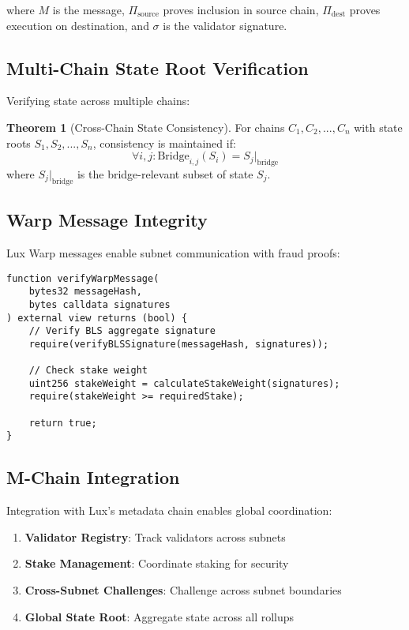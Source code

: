 \documentclass[11pt,a4paper]{article}
\theoremstyle{definition}
\newtheorem{theorem}{Theorem}[section]
\begin{document}
where $M$ is the message, $\Pi_{\text{source}}$ proves inclusion in source chain, $\Pi_{\text{dest}}$ proves execution on destination, and $\sigma$ is the validator signature.

\subsection{Multi-Chain State Root Verification}

Verifying state across multiple chains:

\begin{theorem}[Cross-Chain State Consistency]
For chains $C_1, C_2, ..., C_n$ with state roots $S_1, S_2, ..., S_n$, consistency is maintained if:
\begin{equation}
\forall i,j : \text{Bridge}_{i,j}(S_i) = S_j|_{\text{bridge}}
\end{equation}
where $S_j|_{\text{bridge}}$ is the bridge-relevant subset of state $S_j$.
\end{theorem}

\subsection{Warp Message Integrity}

Lux Warp messages enable subnet communication with fraud proofs:

\begin{lstlisting}[language=Solidity, caption=Warp Message Verification]
function verifyWarpMessage(
    bytes32 messageHash,
    bytes calldata signatures
) external view returns (bool) {
    // Verify BLS aggregate signature
    require(verifyBLSSignature(messageHash, signatures));
    
    // Check stake weight
    uint256 stakeWeight = calculateStakeWeight(signatures);
    require(stakeWeight >= requiredStake);
    
    return true;
}
\end{lstlisting}

\subsection{M-Chain Integration}

Integration with Lux's metadata chain enables global coordination:

\begin{enumerate}
    \item \textbf{Validator Registry}: Track validators across subnets
    \item \textbf{Stake Management}: Coordinate staking for security
    \item \textbf{Cross-Subnet Challenges}: Challenge across subnet boundaries
    \item \textbf{Global State Root}: Aggregate state across all rollups
\end{enumerate}
\end{document}
